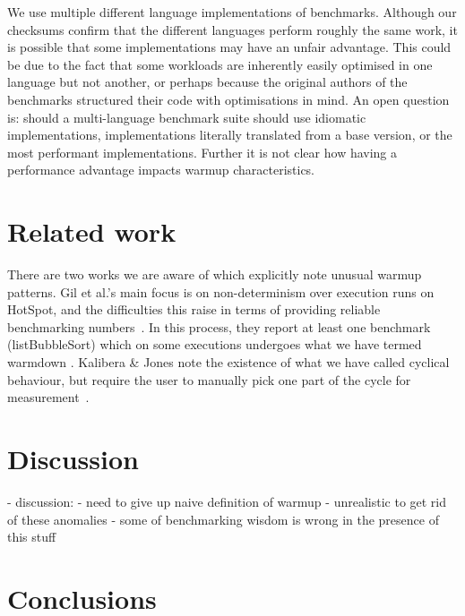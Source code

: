 \documentclass[10pt,preprint]{sigplanconf}
\newcommand{\kalibera}{Kalibera \& Jones\xspace}
\begin{document}
We use multiple different language implementations of benchmarks. Although our
checksums confirm that the different languages perform roughly the same work,
it is possible that some implementations may have an unfair advantage. This
could be due to the fact that some workloads are inherently easily optimised in
one language but not another, or perhaps because the original authors of the
benchmarks structured their code with optimisations in mind. An open question
is: should a multi-language benchmark suite should use idiomatic
implementations, implementations literally translated from a base version, or
the most performant implementations. Further it is not clear how having a
performance advantage impacts warmup characteristics.




\section{Related work}

There are two works we are aware of which explicitly note unusual warmup
patterns. Gil et al.'s main focus is on non-determinism over execution runs on
HotSpot, and the difficulties this raise in terms of providing reliable
benchmarking numbers~\cite{gil11microbenchmark}. In this process, they report at
least one benchmark (listBubbleSort) which on some executions undergoes what we
have termed warmdown . \kalibera note the
existence of what we have called cyclical behaviour, but require the user to
manually pick one part of the cycle for measurement~\cite{kalibera13rigorous}.


\section{Discussion}
\label{sec:Discussion}

  - discussion:
    - need to give up naive definition of warmup
    - unrealistic to get rid of these anomalies
    - some of benchmarking wisdom is wrong in the presence of this stuff

\section{Conclusions}
\label{sec:conclusion}



\end{document}
